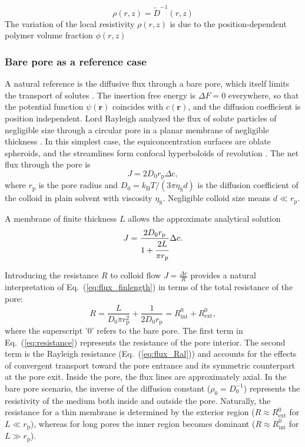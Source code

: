 \documentclass[12pt, a4paper]{article}
\begin{document}
\begin{equation}
    \rho(r,z)= \tilde{D}^{-1}(r,z)
    \label{eq:rho}
\end{equation}
The variation of the local resistivity $\rho(r,z)$ is due to the position-dependent polymer volume fraction $\phi(r,z)$


\subsubsection{Bare pore as a reference case}

A natural reference is the diffusive flux through a bare pore, which itself limits the transport of solutes \cite{Deen1987, Sun2024}.
The insertion free energy is $\Delta F=0$ everywhere, so that the potential function $\psi(\bm{r})$ coincides with $c(\bm{r})$, and the diffusion coefficient is position independent.
Lord Rayleigh analyzed the flux of solute particles of negligible size through a circular pore in a planar membrane of negligible thickness \cite{Strutt1878}.
In this simplest case, the equiconcentration surfaces are oblate spheroids, and the streamlines form confocal hyperboloids of revolution \cite{Cooke1966}.
The net flux through the pore is
\begin{equation}
    J=2D_0r_{\text{p}}\Delta c,
    \label{eq:flux_Ral}
\end{equation}
where $r_{\text{p}}$ is the pore radius and $D_0 = k_{\text{B}}T / (3 \pi \eta_{\text{S}} d)$ is the diffusion coefficient of the colloid in plain solvent with viscosity $\eta_{\text{S}}$.
Negligible colloid size means $d\ll r_{\text{p}}$.

A membrane of finite thickness $L$ allows the approximate analytical solution \cite{Brunn1984}
\begin{equation}
    J=\frac{2 D_0 r_{\text{p}}}{1+\cfrac{2L}{\pi r_{\text{p}}}}\Delta c.
    \label{eq:flux_finlength}
\end{equation}

Introducing the resistance $R$ to colloid flow $J = \frac{\Delta c}{R}$ provides a natural interpretation of Eq.~(\ref{eq:flux_finlength}) in terms of the total resistance of the pore:
\begin{equation}
    R = \frac{L}{D_0 \pi r_{\text{p}}^{2}} + \frac{1}{2 D_0 r_{\text{p}}} = R_{\text{int}}^{0} + R_{\text{ext}}^{0},
    \label{eq:resistance}
\end{equation}
where the superscript '0' refers to the bare pore.
The first term in Eq.~(\ref{eq:resistance}) represents the resistance of the pore interior.
The second term is the Rayleigh resistance (Eq.~(\ref{eq:flux_Ral})) and accounts for the effects of convergent transport toward the pore entrance and its symmetric counterpart at the pore exit.
Inside the pore, the flux lines are approximately axial.
In the bare pore scenario, the inverse of the diffusion constant ($\rho_0=D_0^{-1}$) represents the resistivity of the medium both inside and outside the pore.
Naturally, the resistance for a thin membrane is determined by the exterior region ($R \approx R_{\text{ext}}^{0}$ for $L \ll r_{\text{p}}$), whereas for long pores the inner region becomes dominant ($R \approx R_{\text{int}}^{0}$ for $L \gg r_{\text{p}}$).
\end{document}
